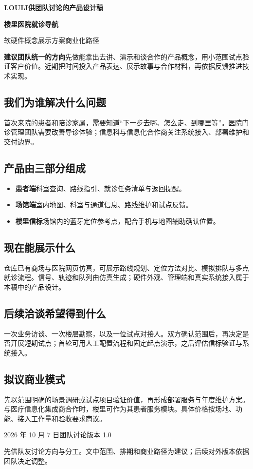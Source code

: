 \documentclass[UTF8,11pt,fontset=fandol]{ctexart}
\newcommand{\tagline}[1]{{\small\color{green}\bfseries #1}\par}
\newcommand{\lead}[1]{\vspace{4pt}\colorbox{pale}{\parbox{\dimexpr\linewidth-16pt\relax}{\vspace{6pt}\color{ink}#1\vspace{6pt}}}\par\vspace{4pt}}
\begin{document}
\thispagestyle{empty}
\tagline{LOULI\quad 供团队讨论的产品设计稿}
{\fontsize{32}{40}\selectfont\bfseries\color{ink}楼里医院就诊导航\par}
\vspace{7pt}
{\Large\color{muted}软硬件概念\quad 展示方案\quad 商业化路径\par}
\vspace{12pt}
\lead{\textbf{建议团队统一的方向}\quad 先做能拿出去讲、演示和谈合作的产品概念，用小范围试点验证客户价值。近期把时间投入产品表达、展示故事与合作材料，再依据反馈推进技术实现。}
\subsection*{我们为谁解决什么问题}
首次来院的患者和陪诊家属，需要知道“下一步去哪、怎么走、到哪里等”。医院门诊管理团队需要改善导诊体验；信息科与信息化合作商关注系统接入、部署维护和交付边界。
\subsection*{产品由三部分组成}
\begin{itemize}
\item \textbf{患者端}\quad 科室查询、路线指引、就诊任务清单与返回提醒。
\item \textbf{场馆端}\quad 室内地图、科室与通道信息、路线维护和试点反馈。
\item \textbf{楼里信标}\quad 场馆内的蓝牙定位参考点，配合手机与地图辅助确认位置。
\end{itemize}
\subsection*{现在能展示什么}
仓库已有商场与医院网页仿真，可展示路线规划、定位方法对比、模拟排队与多点就诊流程。信号、轨迹和队列由仿真生成；硬件外观、管理端和真实系统接入属于本稿中的产品设计。
\subsection*{后续洽谈希望得到什么}
一次业务访谈、一次楼层勘察，以及一位试点对接人。双方确认范围后，再决定是否开展短期试点；首轮可用人工配置流程和固定起点演示，之后评估信标验证与系统接入。
\subsection*{拟议商业模式}
先以范围明确的场景调研或试点项目验证价值，再形成部署服务与年度维护方案。与医疗信息化集成商合作时，楼里可作为其患者服务模块。具体价格按场地、功能、接入工作量和验收要求商议。
\vfill
{\small\color{muted}2026 年 10 月 7 日\quad 团队讨论版本 1.0\par
先供队友讨论方向与分工。文中范围、排期和商业路径为建议；后续对外版本依据团队决定调整。}
\end{document}
